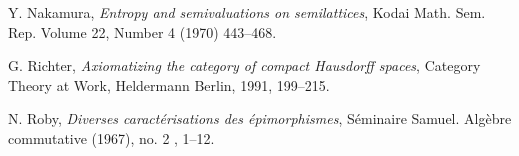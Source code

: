 \documentclass[12pt]{article}
\theoremstyle{definition}
\numberwithin{equation}{section}
\begin{document}
\begin{thebibliography}{999}
{ {Y. Nakamura}, {\em Entropy and semivaluations on semilattices}, Kodai Math. Sem. Rep. Volume 22, Number 4 (1970) 443--468.


 {G. Richter}, {\em Axiomatizing the category of compact Hausdorff spaces}, {Category Theory at Work}, Heldermann Berlin, 1991, 199--215.

 {N. Roby}, {\em Diverses caract{\'e}risations des {\'e}pimorphismes},	{S{\'e}minaire Samuel. Alg{\`e}bre commutative} (1967), no. 2 , {1--12}.



%
%
%




%
%
% 
%

}
\end{thebibliography}
\end{document}
